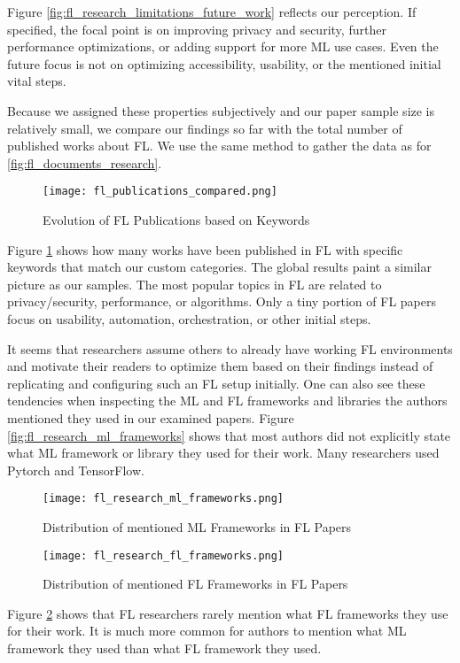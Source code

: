 Figure \ref{fig:fl_research_limitations_future_work} reflects our perception.
If specified, the focal point is on improving privacy and security, further performance optimizations, or adding support for more ML use cases.
Even the future focus is not on optimizing accessibility, usability, or the mentioned initial vital steps.

Because we assigned these properties subjectively and our paper sample size is relatively small,
we compare our findings so far with the total number of published works about FL.
We use the same method to gather the data as for \ref{fig:fl_documents_research}.
\begin{figure}[h]
    \centering
    \texttt{[image: fl\_publications\_compared.png]}
    \caption{Evolution of FL Publications based on Keywords}
    \label{fig:fl_publications_compared}
\end{figure}
Figure \ref{fig:fl_publications_compared} shows how many works have been published in FL with
specific keywords that match our custom categories.
The global results paint a similar picture as our samples.
The most popular topics in FL are related to privacy/security, performance,
or algorithms.
Only a tiny portion of FL papers focus on usability, automation, orchestration,
or other initial steps.

It seems that researchers assume others to already have working FL environments
and motivate their readers to optimize them based on their findings
instead of replicating and configuring such an FL setup initially.
One can also see these tendencies when inspecting the ML and FL frameworks and libraries
the authors mentioned they used in our examined papers.
Figure \ref{fig:fl_research_ml_frameworks} shows that most authors
did not explicitly state what ML framework or library they used for their work.
Many researchers used Pytorch and TensorFlow.
\begin{figure}[p]
    \centering
    \texttt{[image: fl\_research\_ml\_frameworks.png]}
    \caption{Distribution of mentioned ML Frameworks in FL Papers}
    \label{fig:fl_research_ml_frameworks}

    \texttt{[image: fl\_research\_fl\_frameworks.png]}
    \caption{Distribution of mentioned FL Frameworks in FL Papers}
    \label{fig:fl_research_fl_frameworks}
\end{figure}
Figure \ref{fig:fl_research_fl_frameworks} shows that FL researchers
rarely mention what FL frameworks they use for their work.
It is much more common for authors to mention what ML 
framework they used than what FL framework they used.

